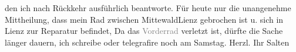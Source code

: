 \begin{ledgroupsized}[t]{13cm}
               den ich nach Rückkehr ausführlich beantworte. Für heute nur die unangenehme
               Mittheilung, dass mein Rad zwischen MittewaldLienz gebrochen ist u. sich in Lienz zur Reparatur befindet, Da das
                  \textcolor{gray}{Vorderrad} verletzt ist, dürfte die Sache länger dauern, ich
               schreibe oder telegrafire noch am Samstag.\pend
           \pstart Herzl. Ihr \spacefill\mbox{Salten}\pend{}
         
         \endnumbering{}\end{ledgroupsized}\begin{anhang}\end{anhang}\newcommand{\dateiname}{L03125}\newcommand{\titel}{Felix Salten an Arthur Schnitzler, 17. 8. 1893}\newcommand{\editorInnen}{Martin Anton Müller und Laura Untner}
      